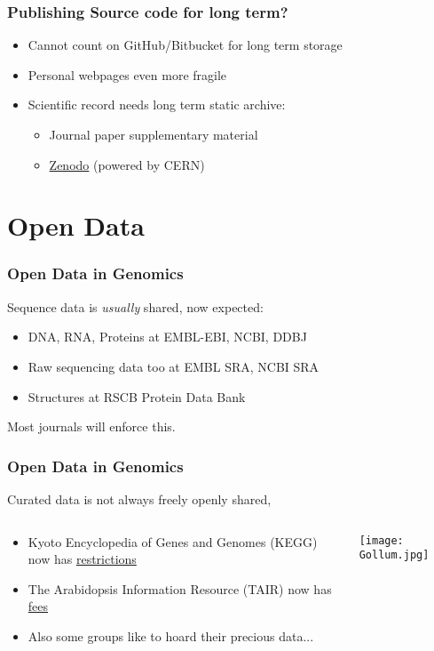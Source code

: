 \begin{frame}
  \frametitle{Publishing Source code for long term?}
  \begin{itemize}
    \item Cannot count on GitHub/Bitbucket for long term storage
    \item Personal webpages even more fragile
    \item Scientific record needs long term static archive:
      \begin{itemize}
        \item Journal paper supplementary material
        \item \href{http://about.zenodo.org/}{Zenodo} (powered by CERN)
      \end{itemize}
  \end{itemize}
\end{frame}

\section{Open Data}

\begin{frame}
  \frametitle{Open Data in Genomics}
  Sequence data is \emph{usually} shared, now expected:
  \begin{itemize}
    \item DNA, RNA, Proteins at EMBL-EBI, NCBI, DDBJ
    \item Raw sequencing data too at EMBL SRA, NCBI SRA
    \item Structures at RSCB Protein Data Bank
  \end{itemize}
  Most journals will enforce this.
\end{frame}

\begin{frame}
  \frametitle{Open Data in Genomics}
  Curated data is not always freely openly shared,
\begin{columns}[T]
\begin{column}{.5\textwidth}
  \begin{itemize}
    \item Kyoto Encyclopedia of Genes and Genomes (KEGG) now has \href{http://www.kegg.jp/kegg/legal.html}{restrictions}
    \item The Arabidopsis Information Resource (TAIR) now has \href{https://www.arabidopsis.org/doc/about/tair_subscriptions/413}{fees}
    \item Also some groups like to hoard their precious data...
  \end{itemize}
\end{column}
\begin{column}{.5\textwidth}
  \texttt{[image: Gollum.jpg]}
\end{column}
\end{columns}
\end{frame}

